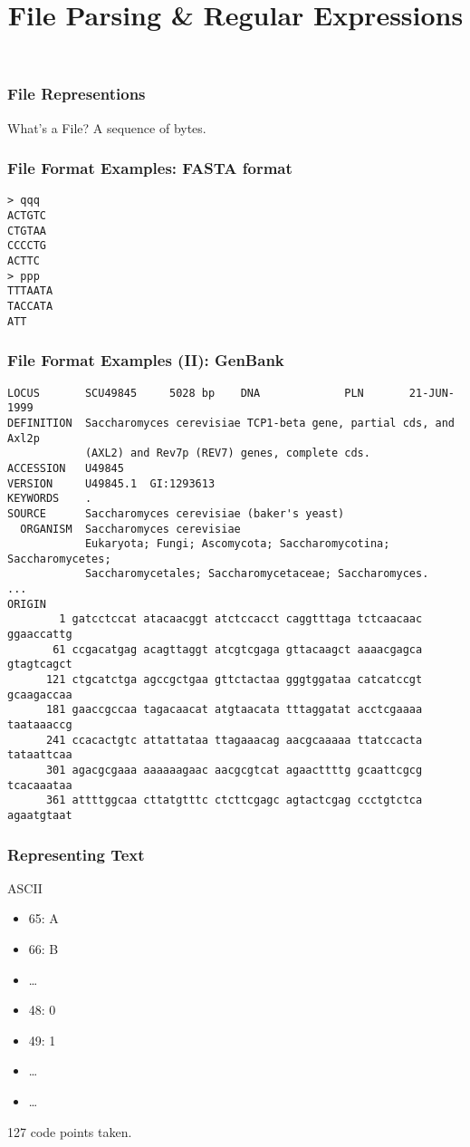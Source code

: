 
\title{File Parsing \& Regular Expressions}

\frame{\maketitle}

\begin{frame}[fragile]
\frametitle{File Representions}
\begin{block}{What's a File?}
A sequence of bytes.
\end{block}
\end{frame}

\begin{frame}[fragile]
\frametitle{File Format Examples: FASTA format}
\begin{verbatim}
> qqq
ACTGTC
CTGTAA
CCCCTG
ACTTC
> ppp
TTTAATA
TACCATA
ATT
\end{verbatim}
\end{frame}

\begin{frame}[fragile]
\frametitle{File Format Examples (II): GenBank}

\begin{verbatim}
LOCUS       SCU49845     5028 bp    DNA             PLN       21-JUN-1999
DEFINITION  Saccharomyces cerevisiae TCP1-beta gene, partial cds, and Axl2p
            (AXL2) and Rev7p (REV7) genes, complete cds.
ACCESSION   U49845
VERSION     U49845.1  GI:1293613
KEYWORDS    .
SOURCE      Saccharomyces cerevisiae (baker's yeast)
  ORGANISM  Saccharomyces cerevisiae
            Eukaryota; Fungi; Ascomycota; Saccharomycotina; Saccharomycetes;
            Saccharomycetales; Saccharomycetaceae; Saccharomyces.
...
ORIGIN
        1 gatcctccat atacaacggt atctccacct caggtttaga tctcaacaac ggaaccattg
       61 ccgacatgag acagttaggt atcgtcgaga gttacaagct aaaacgagca gtagtcagct
      121 ctgcatctga agccgctgaa gttctactaa gggtggataa catcatccgt gcaagaccaa
      181 gaaccgccaa tagacaacat atgtaacata tttaggatat acctcgaaaa taataaaccg
      241 ccacactgtc attattataa ttagaaacag aacgcaaaaa ttatccacta tataattcaa
      301 agacgcgaaa aaaaaagaac aacgcgtcat agaacttttg gcaattcgcg tcacaaataa
      361 attttggcaa cttatgtttc ctcttcgagc agtactcgag ccctgtctca agaatgtaat
\end{verbatim}
\end{frame}

\begin{frame}[fragile]
\frametitle{Representing Text}
\begin{block}{ASCII}
\begin{itemize}
\item 65: A
\item 66: B
\item \ldots
\item 48: 0
\item 49: 1
\item \ldots
\item \ldots
\end{itemize}

127 code points taken.
\end{block}
\end{frame}

